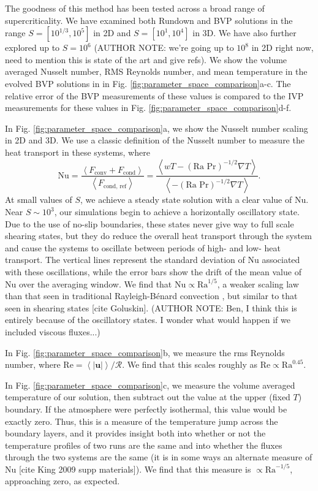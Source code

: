 \documentclass[aps, pre, onecolumn, nofootinbib, notitlepage, groupedaddress, amsfonts, amssymb, amsmath, longbibliography]{revtex4-1}
\newcommand{\angles}[1]{\ensuremath{\left\langle #1 \right\rangle}}
\newcommand{\grad}{\ensuremath{\nabla}}
\newcommand{\RB}{Rayleigh-B\'{e}nard }
\begin{document}
The goodness of this method has been tested across a broad range of supercriticality.  We have
examined both Rundown and BVP solutions in the range $S = [10^{1/3}, 10^5]$ in 2D and
$S = [10^1, 10^4]$ in 3D.  We have also further explored up to $S = 10^6$
(AUTHOR NOTE: we're going up to $10^8$ in 2D right now, need to mention this is state of
the art and give refs).
We show the volume averaged Nusselt number, RMS Reynolds number, and mean temperature in
the evolved BVP solutions in in Fig. \ref{fig:parameter_space_comparison}a-c.
The relative error of the BVP measurements of these values is compared to the IVP
measurements for these values in Fig. \ref{fig:parameter_space_comparison}d-f.

In Fig. \ref{fig:parameter_space_comparison}a, we show the Nusselt number scaling in 2D and
3D.  We use a classic definition of the Nusselt number
to measure the heat transport in these systems, where
\begin{equation}
\text{Nu} = \frac{\angles{F_{\text{conv}} + F_{\text{cond}}}}{\angles{F_{\text{cond, ref}}}}
 = \frac{\angles{wT - (\text{Ra Pr})^{-1/2}\grad T}}{\angles{- (\text{Ra Pr})^{-1/2} \grad T}}.
\end{equation}
At small values of $S$, we achieve a steady state solution with a clear value of Nu.  Near
$S \sim 10^3$, our simulations begin to achieve a horizontally oscillatory state.  Due to the
use of no-slip boundaries, these states never give way to full scale shearing states, but they
do reduce the overall heat transport through the system and cause the systems to oscillate between
periods of high- and low- heat transport.  The vertical lines represent the standard deviation 
of Nu associated with these oscillations, while the error bars show the drift of the mean
value of Nu over the averaging window.  We find that $\text{Nu} \propto \text{Ra}^{1/5}$,
a weaker scaling law than that seen in traditional \RB convection \cite{johnston&doering2009},
but similar to that seen in shearing states [cite Goluskin].
(AUTHOR NOTE: Ben, I think this is entirely because of the oscillatory states.  I wonder what
would happen if we included viscous fluxes...)

In Fig. \ref{fig:parameter_space_comparison}b, we measure the rms Reynolds number, where
$\text{Re} = \angles{|\bm{u}|} / \mathcal{R}$.  We find that this scales roughly as
$\text{Re} \propto \text{Ra}^{0.45}$.

In Fig. \ref{fig:parameter_space_comparison}c, we measure the volume averaged 
temperature of our solution, then subtract out the value at the upper (fixed $T$) boundary.
If the atmosphere were perfectly isothermal, this value would be exactly zero.  Thus, this is
a measure of the temperature jump across the boundary layers, and it provides insight both
into whether or not the temperature profiles of two runs are the same and into whether
the fluxes through the two systems are the same (it is in some ways an alternate measure of Nu
[cite King 2009 supp materials]).
We find that this measure is $\propto \text{Ra}^{-1/5}$, approaching zero, as expected.
\end{document}
